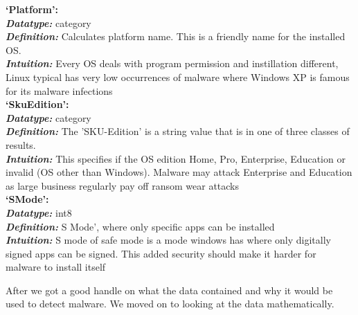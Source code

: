 \documentclass[sigconf]{acmart}
\begin{document}
\begin{center}
    \textbf{`Platform':\\}
    \textbf{\textit{Datatype: }}category\\
    \textbf{\textit{Definition: }} Calculates platform name. This is a friendly name for the installed OS.\\
    \textbf{\textit{Intuition: }}Every OS deals with program permission and instillation different, Linux typical has very low occurrences of malware where Windows XP is famous for its malware infections\\
    \vspace{5mm}
    \textbf{`SkuEdition':\\}
    \textbf{\textit{Datatype: }}category\\
    \textbf{\textit{Definition: }}The ’SKU-Edition’ is a string value that is in one of three classes of results. \\
    \textbf{\textit{Intuition: }}This specifies if the OS edition Home, Pro, Enterprise, Education or invalid (OS other than Windows). Malware may attack Enterprise and Education as large business regularly pay off ransom wear attacks\\
    \vspace{5mm}
    \textbf{`SMode':\\}
    \textbf{\textit{Datatype: }}int8\\
    \textbf{\textit{Definition: }}S Mode’, where only specific apps can be installed \\
    \textbf{\textit{Intuition: }}S mode of safe mode is a mode windows has where only digitally signed apps can be signed. This added security should make it harder for malware to install itself\\
    \vspace{5mm}
\end{center}
After we got a good handle on what the data contained and why it would be used to detect malware. We moved on to looking at the data mathematically. 
\end{document}
